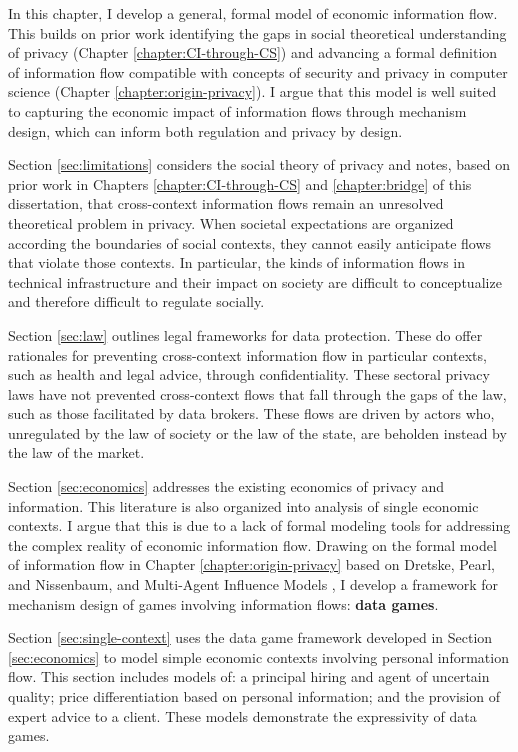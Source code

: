 \documentclass[../thesis.tex]{subfiles}
\begin{document}
In this chapter, I develop a general, formal model
of economic information flow.
This builds on prior work identifying the gaps in
social theoretical understanding of privacy
(Chapter \ref{chapter:CI-through-CS})
and advancing a formal definition of information flow
compatible with concepts of security and privacy
in computer science (Chapter \ref{chapter:origin-privacy}).
I argue that this model is well suited to capturing
the economic impact of information flows through
mechanism design, which can inform both regulation
and privacy by design.

Section \ref{sec:limitations} considers the social
theory of privacy and notes, based on prior work
in Chapters \ref{chapter:CI-through-CS} and \ref{chapter:bridge}
of this dissertation, that cross-context
information flows remain an unresolved theoretical problem
in privacy.
When societal expectations are organized according
the boundaries of social contexts, they cannot easily
anticipate flows that violate those contexts.
In particular, the kinds of information flows in
technical infrastructure and their impact on society
are difficult to conceptualize and therefore
difficult to regulate socially.

Section \ref{sec:law} outlines legal frameworks
for data protection.
These do offer rationales for preventing cross-context
information flow in particular contexts, such as
health and legal advice, through confidentiality.
These sectoral privacy laws have not prevented
cross-context flows that fall through the gaps
of the law, such as those facilitated by data brokers.
These flows are driven by actors who, unregulated
by the law of society or the law of the state,
are beholden instead by the law of the market.

Section \ref{sec:economics} addresses the existing
economics of privacy and information.
This literature is also organized into analysis
of single economic contexts.
I argue that this is due to a lack of formal modeling
tools for addressing the complex reality of economic
information flow.
Drawing on the formal model of information flow in
Chapter \ref{chapter:origin-privacy}
based on Dretske, Pearl, and Nissenbaum,
and Multi-Agent Influence Models \cite{koller2003multi},
I develop a framework for mechanism design of games
involving information flows: \textbf{data games}.

Section \ref{sec:single-context} uses the data game framework
developed in Section \ref{sec:economics} to model simple
economic contexts involving personal information flow.
This section includes models of: a principal hiring
and agent of uncertain quality; price differentiation
based on personal information; and the provision
of expert advice to a client.
These models demonstrate the expressivity of
data games.
\end{document}
